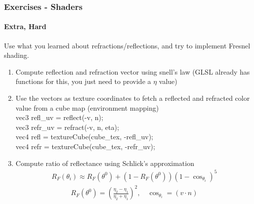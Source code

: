 \documentclass[11pt]{beamer}
\begin{document}
	\begin{frame}
		\frametitle{Exercises - Shaders}
	\framesubtitle{Extra, Hard}
	Use what you learned about refractions/reflections, and try to implement Fresnel shading.
	\begin{enumerate}
	\item Compute reflection and refraction vector using snell's law (GLSL already has functions for this, you just need to provide a $\eta$ value)
	\item Use the vectors as texture coordinates to fetch a reflected and refracted color value from a cube map (environment mapping)\\
	vec3 refl\_uv = reflect(-v, n);\\
	vec3 refr\_uv = refract(-v, n, eta);\\
	vec4 refl = textureCube(cube\_tex, -refl\_uv);\\
	vec4 refr = textureCube(cube\_tex, -refr\_uv);\\
	\item Compute ratio of reflectance using Schlick's approximation
	\begin{align*}
	R_F({\theta_i}) \approx R_F({\theta^0})+(1-R_F({\theta^0}))(1-\cos_{\theta_i})^5 
	\end{align*}
	\begin{align*}
	 R_F({\theta^0}) = \left(\frac{\eta_2-\eta_1}{\eta_2+\eta_1}\right)^2, \quad \cos_{\theta_i} = (v\cdot n)
	\end{align*}
	\end{enumerate}
	\end{frame}
\end{document}
